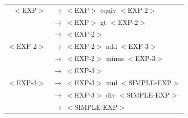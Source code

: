 \documentclass[a4paper,10pt]{article}
\begin{document}
	\begin{center}\begin{tabular}{rl}
		$<$EXP$>$			& $\rightarrow$ $<$EXP$>$ equiv $<$EXP-2$>$ \\
							& $\rightarrow$ $<$EXP$>$ gt $<$EXP-2$>$ \\ 
							& $\rightarrow$ $<$EXP-2$>$ \\
					
		$<$EXP-2$>$			& $\rightarrow$ $<$EXP-2$>$ add $<$EXP-3$>$   \\
							& $\rightarrow$ $<$EXP-2$>$ minus $<$EXP-3$>$ \\ 
							& $\rightarrow$ $<$EXP-3$>$ \\

		$<$EXP-3$>$			& $\rightarrow$ $<$EXP-3$>$ mul $<$SIMPLE-EXP$>$  \\
							& $\rightarrow$ $<$EXP-3$>$ div $<$SIMPLE-EXP$>$\\ 
							& $\rightarrow$ $<$SIMPLE-EXP$>$ \\					
	\end{tabular}\end{center}
\end{document}
